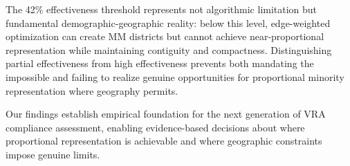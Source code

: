 The 42\% effectiveness threshold represents not algorithmic limitation but fundamental demographic-geographic reality: below this level, edge-weighted optimization can create MM districts but cannot achieve near-proportional representation while maintaining contiguity and compactness. Distinguishing partial effectiveness from high effectiveness prevents both mandating the impossible and failing to realize genuine opportunities for proportional minority representation where geography permits.

Our findings establish empirical foundation for the next generation of VRA compliance assessment, enabling evidence-based decisions about where proportional representation is achievable and where geographic constraints impose genuine limits.
